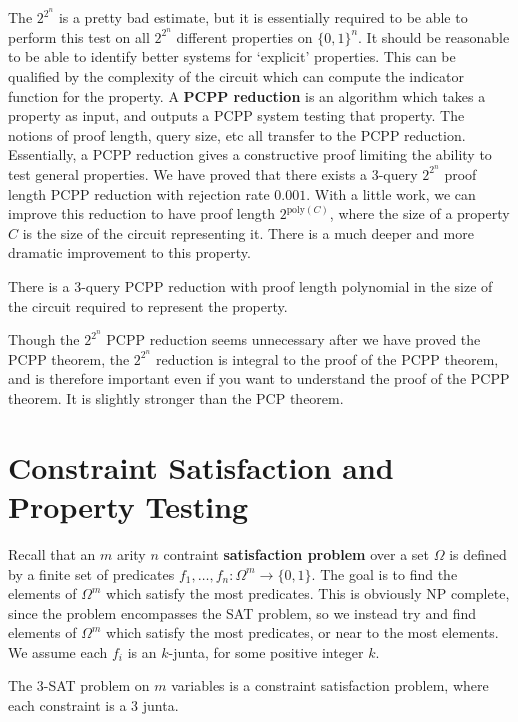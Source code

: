 The $2^{2^n}$ is a pretty bad estimate, but it is essentially required to be able to perform this test on all $2^{2^n}$ different properties on $\{ 0, 1 \}^n$. It should be reasonable to be able to identify better systems for `explicit' properties. This can be qualified by the complexity of the circuit which can compute the indicator function for the property. A {\bf PCPP reduction} is an algorithm which takes a property as input, and outputs a PCPP system testing that property. The notions of proof length, query size, etc all transfer to the PCPP reduction. Essentially, a PCPP reduction gives a constructive proof limiting the ability to test general properties. We have proved that there exists a 3-query $2^{2^n}$ proof length PCPP reduction with rejection rate $0.001$. With a little work, we can improve this reduction to have proof length $2^{\text{poly}(C)}$, where the size of a property $C$ is the size of the circuit representing it. There is a much deeper and more dramatic improvement to this property.

\begin{theorem}[PCPP]
    There is a 3-query PCPP reduction with proof length polynomial in the size of the circuit required to represent the property.
\end{theorem}

Though the $2^{2^n}$ PCPP reduction seems unnecessary after we have proved the PCPP theorem, the $2^{2^n}$ reduction is integral to the proof of the PCPP theorem, and is therefore important even if you want to understand the proof of the PCPP theorem. It is slightly stronger than the PCP theorem.

\section{Constraint Satisfaction and Property Testing}

Recall that an $m$ arity $n$ contraint {\bf satisfaction problem} over a set $\Omega$ is defined by a finite set of predicates $f_1, \dots, f_n: \Omega^m \to \{ 0, 1 \}$. The goal is to find the elements of $\Omega^m$ which satisfy the most predicates. This is obviously NP complete, since the problem encompasses the SAT problem, so we instead try and find elements of $\Omega^m$ which satisfy the most predicates, or near to the most elements. We assume each $f_i$ is an $k$-junta, for some positive integer $k$.

\begin{example}
    The 3-SAT problem on $m$ variables is a constraint satisfaction problem, where each constraint is a 3 junta.
\end{example}

